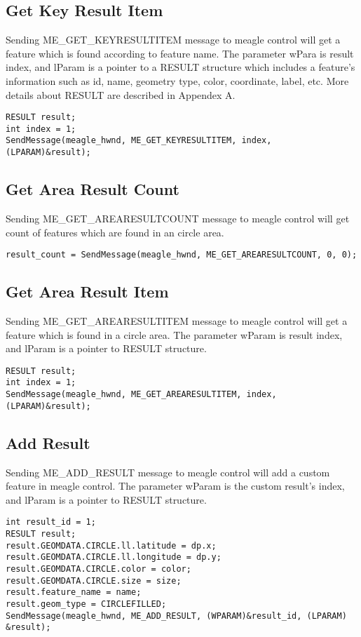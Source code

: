\documentclass[a4paper]{article}
\begin{document}
\subsection{Get Key Result Item}
Sending ME\_GET\_KEYRESULTITEM message to meagle control will get a feature which is found according to feature name. The parameter wPara is result index, and lParam is a pointer to a RESULT structure which includes a feature's information such as  id, name, geometry type, color, coordinate, label, etc. More details about RESULT are described in Appendex A.
\begin{lstlisting}
RESULT result;
int index = 1;
SendMessage(meagle_hwnd, ME_GET_KEYRESULTITEM, index, (LPARAM)&result);
\end{lstlisting}


\subsection{Get Area Result Count}
Sending ME\_GET\_AREARESULTCOUNT message to meagle control will get count of features which are found in an circle area.
\begin{lstlisting}
result_count = SendMessage(meagle_hwnd, ME_GET_AREARESULTCOUNT, 0, 0);
\end{lstlisting}

\subsection{Get Area Result Item}
Sending ME\_GET\_AREARESULTITEM message to meagle control will get a feature which is found in a circle area. The parameter wParam is result index, and lParam is a pointer to RESULT structure.
\begin{lstlisting}
RESULT result;
int index = 1;
SendMessage(meagle_hwnd, ME_GET_AREARESULTITEM, index, (LPARAM)&result);
\end{lstlisting}


\subsection{Add Result}
Sending ME\_ADD\_RESULT message to meagle control will add a custom feature in meagle control. The parameter wParam is the custom result's index, and lParam is a pointer to RESULT structure. 
\begin{lstlisting}
int result_id = 1;
RESULT result;
result.GEOMDATA.CIRCLE.ll.latitude = dp.x;
result.GEOMDATA.CIRCLE.ll.longitude = dp.y;
result.GEOMDATA.CIRCLE.color = color;
result.GEOMDATA.CIRCLE.size = size;
result.feature_name = name;
result.geom_type = CIRCLEFILLED;
SendMessage(meagle_hwnd, ME_ADD_RESULT, (WPARAM)&result_id, (LPARAM) &result);
\end{lstlisting}
\end{document}
